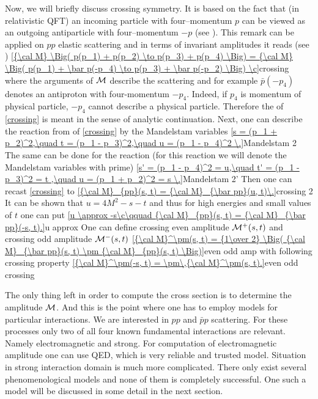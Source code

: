 Now, we will briefly discuss crossing symmetry. It is based on the fact that (in relativistic QFT) an incoming particle with four--momentum $p$ can be viewed as an outgoing antiparticle with four--momentum $-p$ (see \rf{} ). This remark can be applied on $pp$ elastic scattering and in terms of invariant amplitudes it reads (see \rf{} )
\eqref{{\cal M} \Big(  p(p_1) + p(p_2) \to p(p_3) + p(p_4)  \Big) = {\cal M} \Big(  p(p_1) + \bar p(-p_4) \to p(p_3) + \bar p(-p_2)  \Big) \c}{crossing}
where the arguments of ${\cal M}$ describe the scattering and for example $\bar p(-p_4)$ denotes an antiproton with four-momentum $-p_4$. Indeed, if $p_4$ is momentum of physical particle, $-p_4$ cannot describe a physical particle. Therefore the \rhs{} of \equ{} \ref{crossing} is meant in the sense of analytic continuation. Next, one can describe the reaction from \lhs{} of \equ{} \ref{crossing} by the Mandelstam variables
\eqref{s = (p_1 + p_2)^2,\quad t = (p_1 - p_3)^2,\quad u = (p_1 - p_4)^2 \.}{Mandelstam 2}
The same can be done for the \rhs{} reaction (for this reaction we will denote the Mandelstam variables with prime)
\eqref{s' = (p_1 - p_4)^2 = u,\quad t' = (p_1 - p_3)^2 = t ,\quad u = (p_1 + p_2)^2 = s \.}{Mandelstam 2'}
Then one can recast \equ{} \ref{crossing} to
\eqref{{\cal M}_{pp}(s, t) = {\cal M}_{\bar pp}(u, t)\.}{crossing 2}
It can be shown that $u = 4M^2 - s - t$ and thus for high energies and small values of $t$ one can put
\eqref{u \approx -s\c\qquad {\cal M}_{pp}(s, t) = {\cal M}_{\bar pp}(-s, t).}{u approx}
One can define crossing even amplitude ${\cal M}^{+}(s, t)$ and crossing odd amplitude ${\cal M}^{-}(s, t)$
\eqref{{\cal M}^\pm(s, t) = {1\over 2} \Big( {\cal M}_{\bar pp}(s, t) \pm {\cal M}_{pp}(s, t) \Big)}{even odd amp}
with following crossing property
\eqref{{\cal M}^\pm(-s, t) = \pm\,{\cal M}^\pm(s, t).}{even odd crossing}

The only thing left in order to compute the cross section is to determine the amplitude $\cal M$. And this is the point where one has to employ models for particular interactions. We are interested in $pp$ and $\bar pp$ scattering. For these processes only two of all four known fundamental interactions are relevant. Namely electromagnetic and strong. For computation of electromagnetic amplitude one can use QED, which is very reliable and trusted model. Situation in strong interaction domain is much more complicated. There only exist several phenomenological models and none of them is completely successful. One such a model will be discussed in some detail in the next section.




